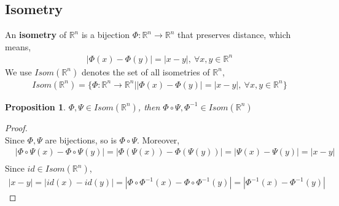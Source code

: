 \documentclass[11pt,a4paper]{article}
\newtheorem{proposition}{Proposition}
\begin{document}
\subsection{ Isometry}
An \textbf{isometry} of $\mathbb{R}^n$ is a bijection $\varPhi :\mathbb{R}^n \rightarrow \mathbb{R}^n$ that preserves distance, which means,
\begin{equation}
    \begin{aligned}
        |\varPhi(x)-\varPhi(y)|=|x-y|,\ \forall x,y\in \mathbb{R}^n
    \end{aligned}
    \nonumber
\end{equation}
We use $Isom(\mathbb{R}^n)$ denotes the set of all isometries of $\mathbb{R}^n$,
\begin{equation}
    \begin{aligned}
        Isom(\mathbb{R}^n)=\{\varPhi:\mathbb{R}^n \rightarrow \mathbb{R}^n | |\varPhi(x)-\varPhi(y)|=|x-y|,\ \forall x,y\in \mathbb{R}^n\}
    \end{aligned}
    \nonumber
\end{equation}


\begin{proposition}
$\varPhi, \varPsi \in Isom(\mathbb{R}^n)$, then $\varPhi\circ\varPsi, \varPhi^{-1}\in Isom(\mathbb{R}^n)$
\end{proposition}
\begin{proof}
\quad\\
Since $\varPhi,\varPsi$ are bijections, so is $\varPhi\circ\varPsi$. Moreover,\\
\begin{equation}
    \begin{aligned}
        &|\varPhi\circ\varPsi(x)-\varPhi\circ\varPsi(y)|=|\varPhi(\varPsi(x))-\varPhi(\varPsi(y))|=|\varPsi(x)-\varPsi(y)|=|x-y|\\
    \end{aligned}
    \nonumber
\end{equation}
Since $id\in Isom (\mathbb{R}^n)$,
\begin{equation}
    \begin{aligned}
        |x-y|=|id(x)-id(y)|=|\varPhi\circ\varPhi^{-1}(x)-\varPhi\circ\varPhi^{-1}(y)|=|\varPhi^{-1}(x)-\varPhi^{-1}(y)|
    \end{aligned}
    \nonumber
\end{equation}
\end{proof}
\end{document}
